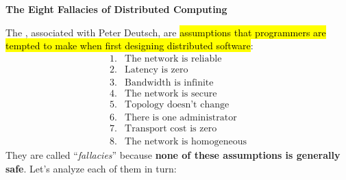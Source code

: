 \highspace
\begin{flushleft}
    \textcolor{Green3}{ \textbf{The Eight Fallacies of Distributed Computing}}
\end{flushleft}
The , associated with Peter Deutsch, are \hl{assumptions that programmers are tempted to make when first designing distributed software}:
\begin{equation*}
    \boxed{
        \begin{array}{ll}
            1.&\text{The network is reliable}\\[.3em]
            2.&\text{Latency is zero}\\[.3em]
            3.&\text{Bandwidth is infinite}\\[.3em]
            4.&\text{The network is secure}\\[.3em]
            5.&\text{Topology doesn't change}\\[.3em]
            6.&\text{There is one administrator}\\[.3em]
            7.&\text{Transport cost is zero}\\[.3em]
            8.&\text{The network is homogeneous}
        \end{array}
    }
\end{equation*}
They are called ``\emph{fallacies}'' because \textbf{none of these assumptions is generally safe}. Let's analyze each of them in turn:
